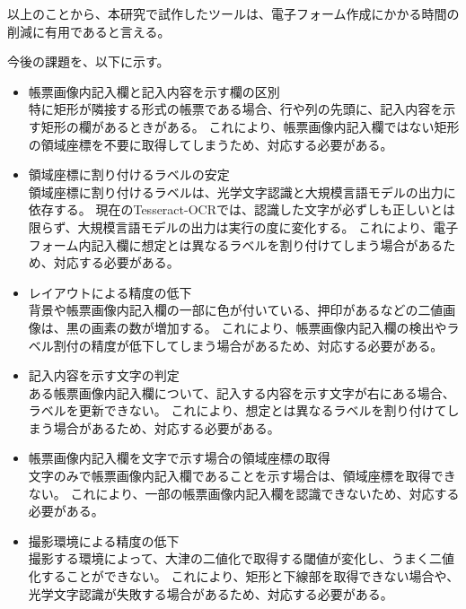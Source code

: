 以上のことから、本研究で試作したツールは、電子フォーム作成にかかる時間の削減に有用であると言える。

今後の課題を、以下に示す。

\begin{itemize}
    \item 帳票画像内記入欄と記入内容を示す欄の区別\\
        特に矩形が隣接する形式の帳票である場合、行や列の先頭に、記入内容を示す矩形の欄があるときがある。
        これにより、帳票画像内記入欄ではない矩形の領域座標を不要に取得してしまうため、対応する必要がある。
    \item 領域座標に割り付けるラベルの安定\\
        領域座標に割り付けるラベルは、光学文字認識と大規模言語モデルの出力に依存する。
        現在のTesseract-OCRでは、認識した文字が必ずしも正しいとは限らず、大規模言語モデルの出力は実行の度に変化する。
        これにより、電子フォーム内記入欄に想定とは異なるラベルを割り付けてしまう場合があるため、対応する必要がある。
    \item レイアウトによる精度の低下\\
        背景や帳票画像内記入欄の一部に色が付いている、押印があるなどの二値画像は、黒の画素の数が増加する。
        これにより、帳票画像内記入欄の検出やラベル割付の精度が低下してしまう場合があるため、対応する必要がある。
    \item 記入内容を示す文字の判定\\
        ある帳票画像内記入欄について、記入する内容を示す文字が右にある場合、ラベルを更新できない。
        これにより、想定とは異なるラベルを割り付けてしまう場合があるため、対応する必要がある。
    \item 帳票画像内記入欄を文字で示す場合の領域座標の取得\\
        文字のみで帳票画像内記入欄であることを示す場合は、領域座標を取得できない。
        これにより、一部の帳票画像内記入欄を認識できないため、対応する必要がある。
    \item 撮影環境による精度の低下\\
        撮影する環境によって、大津の二値化で取得する閾値が変化し、うまく二値化することができない。
        これにより、矩形と下線部を取得できない場合や、光学文字認識が失敗する場合があるため、対応する必要がある。
\end{itemize}